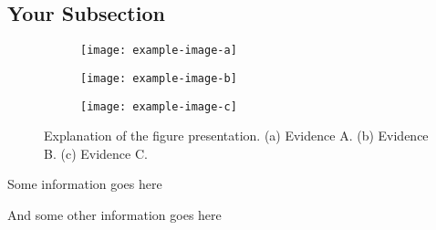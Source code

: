 \documentclass[11pt]{article}
\begin{document}
\subsection{Your Subsection}

\blindtext

\begin{figure}[!hbt]
	\centering
	\begin{subfigure}[b]{0.38\textwidth}
		\texttt{[image: example-image-a]}
		\caption{}
		\label{fig:exampleImageA}		%
		\texttt{[image: example-image-b]}
		\caption{}
		\label{fig:exampleImageB}		%
	\end{subfigure}
	\begin{subfigure}[b]{0.6\textwidth}
		\centering
		\texttt{[image: example-image-c]}
		\caption{}
		\label{fig:exampleImageC}		%
	\end{subfigure}
	\caption{Explanation of the figure presentation. (a) Evidence A. (b) Evidence B. (c) Evidence C.}
	\label{fig:exampleImages}		%
\end{figure}

\blindtext

\begin{noteblock}
Some information goes here

And some other information goes here
\end{noteblock}

\blindtext
\end{document}
